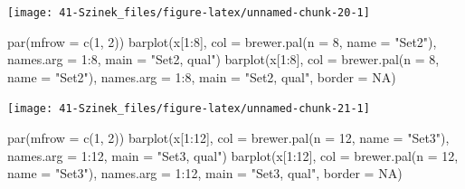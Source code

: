 \documentclass[
]{book}
\newenvironment{Shaded}{\begin{snugshade}}{\end{snugshade}}
\newcommand{\AttributeTok}[1]{\textcolor[rgb]{0.77,0.63,0.00}{#1}}
\newcommand{\ConstantTok}[1]{\textcolor[rgb]{0.00,0.00,0.00}{#1}}
\newcommand{\DecValTok}[1]{\textcolor[rgb]{0.00,0.00,0.81}{#1}}
\newcommand{\FunctionTok}[1]{\textcolor[rgb]{0.00,0.00,0.00}{#1}}
\newcommand{\NormalTok}[1]{#1}
\newcommand{\SpecialCharTok}[1]{\textcolor[rgb]{0.00,0.00,0.00}{#1}}
\newcommand{\StringTok}[1]{\textcolor[rgb]{0.31,0.60,0.02}{#1}}
\begin{document}
\begin{center}\texttt{[image: 41-Szinek\_files/figure-latex/unnamed-chunk-20-1]} \end{center}

\begin{Shaded}
\begin{Highlighting}[]
\FunctionTok{par}\NormalTok{(}\AttributeTok{mfrow =} \FunctionTok{c}\NormalTok{(}\DecValTok{1}\NormalTok{, }\DecValTok{2}\NormalTok{))}
\FunctionTok{barplot}\NormalTok{(x[}\DecValTok{1}\SpecialCharTok{:}\DecValTok{8}\NormalTok{], }\AttributeTok{col =} \FunctionTok{brewer.pal}\NormalTok{(}\AttributeTok{n =} \DecValTok{8}\NormalTok{, }\AttributeTok{name =} \StringTok{"Set2"}\NormalTok{), }\AttributeTok{names.arg =} \DecValTok{1}\SpecialCharTok{:}\DecValTok{8}\NormalTok{, }\AttributeTok{main =} \StringTok{"Set2, qual"}\NormalTok{)}
\FunctionTok{barplot}\NormalTok{(x[}\DecValTok{1}\SpecialCharTok{:}\DecValTok{8}\NormalTok{], }\AttributeTok{col =} \FunctionTok{brewer.pal}\NormalTok{(}\AttributeTok{n =} \DecValTok{8}\NormalTok{, }\AttributeTok{name =} \StringTok{"Set2"}\NormalTok{), }\AttributeTok{names.arg =} \DecValTok{1}\SpecialCharTok{:}\DecValTok{8}\NormalTok{, }\AttributeTok{main =} \StringTok{"Set2, qual"}\NormalTok{, }
    \AttributeTok{border =} \ConstantTok{NA}\NormalTok{)}
\end{Highlighting}
\end{Shaded}

\begin{center}\texttt{[image: 41-Szinek\_files/figure-latex/unnamed-chunk-21-1]} \end{center}

\begin{Shaded}
\begin{Highlighting}[]
\FunctionTok{par}\NormalTok{(}\AttributeTok{mfrow =} \FunctionTok{c}\NormalTok{(}\DecValTok{1}\NormalTok{, }\DecValTok{2}\NormalTok{))}
\FunctionTok{barplot}\NormalTok{(x[}\DecValTok{1}\SpecialCharTok{:}\DecValTok{12}\NormalTok{], }\AttributeTok{col =} \FunctionTok{brewer.pal}\NormalTok{(}\AttributeTok{n =} \DecValTok{12}\NormalTok{, }\AttributeTok{name =} \StringTok{"Set3"}\NormalTok{), }\AttributeTok{names.arg =} \DecValTok{1}\SpecialCharTok{:}\DecValTok{12}\NormalTok{, }
    \AttributeTok{main =} \StringTok{"Set3, qual"}\NormalTok{)}
\FunctionTok{barplot}\NormalTok{(x[}\DecValTok{1}\SpecialCharTok{:}\DecValTok{12}\NormalTok{], }\AttributeTok{col =} \FunctionTok{brewer.pal}\NormalTok{(}\AttributeTok{n =} \DecValTok{12}\NormalTok{, }\AttributeTok{name =} \StringTok{"Set3"}\NormalTok{), }\AttributeTok{names.arg =} \DecValTok{1}\SpecialCharTok{:}\DecValTok{12}\NormalTok{, }
    \AttributeTok{main =} \StringTok{"Set3, qual"}\NormalTok{, }\AttributeTok{border =} \ConstantTok{NA}\NormalTok{)}
\end{Highlighting}
\end{Shaded}
\end{document}
